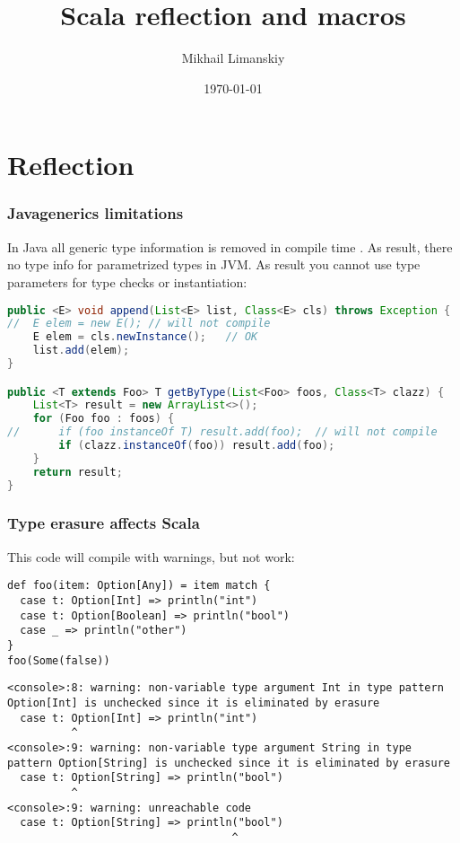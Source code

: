 \documentclass[t]{beamer}
\title{Scala reflection and macros}
\author{Mikhail Limanskiy}
\institute{SymphonyTeleca}
\date{\today}
\begin{document}
\begin{frame}
    \titlepage
\end{frame}

\section{Reflection}

\begin{frame}[fragile]
\frametitle{Java\texttrademark generics limitations}

In Java all generic type information is removed in compile time \cite{erasure}.  As result, there no type info for
parametrized types in JVM.  As result you cannot use type parameters for type checks or instantiation:

\begin{lstlisting}[language=Java]
public <E> void append(List<E> list, Class<E> cls) throws Exception {
//  E elem = new E(); // will not compile
    E elem = cls.newInstance();   // OK
    list.add(elem);
}

public <T extends Foo> T getByType(List<Foo> foos, Class<T> clazz) {
    List<T> result = new ArrayList<>();
    for (Foo foo : foos) {
//      if (foo instanceOf T) result.add(foo);  // will not compile
        if (clazz.instanceOf(foo)) result.add(foo);
    }
    return result;
}
\end{lstlisting}
\end{frame}

\begin{frame}[fragile]
\frametitle{Type erasure affects Scala}
This code will compile with warnings, but not work:
\begin{lstlisting}
def foo(item: Option[Any]) = item match {
  case t: Option[Int] => println("int")
  case t: Option[Boolean] => println("bool")
  case _ => println("other")
}
foo(Some(false))
\end{lstlisting}
\begin{lstlisting}[breaklines=true]
<console>:8: warning: non-variable type argument Int in type pattern Option[Int] is unchecked since it is eliminated by erasure
  case t: Option[Int] => println("int")
          ^
<console>:9: warning: non-variable type argument String in type pattern Option[String] is unchecked since it is eliminated by erasure
  case t: Option[String] => println("bool")
          ^
<console>:9: warning: unreachable code
  case t: Option[String] => println("bool")
                                   ^
\end{lstlisting}
\end{frame}
\end{document}
